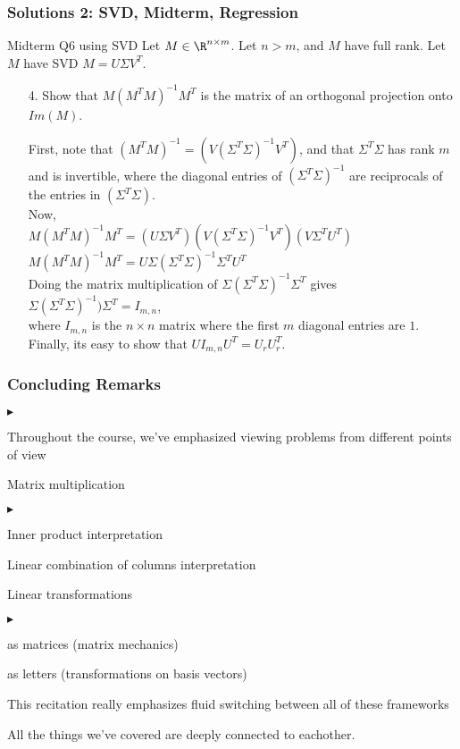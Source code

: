 \documentclass{beamer}
\renewenvironment{itemize}
\renewenvironment{enumerate}%
{\begin{list}{\arabic{enumi}.}%
      {\setlength{\leftmargin}{2.5em}%
       \setlength{\itemsep}{-\parsep}%
       \setlength{\topsep}{-\parskip}%
       \usecounter{enumi}}%
 }{\end{list}}
\renewenvironment{itemize}%
{\begin{list}{$\blacktriangleright$}%
      {\setlength{\leftmargin}{2.5em}%
       \setlength{\itemsep}{-\parsep}%
       \setlength{\topsep}{-\parskip}%
       \usecounter{enumi}}%
 }{\end{list}}
\begin{document}
\begin{frame}
\frametitle{Solutions 2: SVD, Midterm, Regression}
Midterm Q6 using SVD
Let $M\in \R^{n\times m}$. Let $n>m$, and $M$ have full rank. Let $M$ have SVD $M= U\Sigma V^T$.
\begin{enumerate}
\item[4.] Show that $M(M^TM)^{-1}M^T$ is the matrix of an orthogonal projection onto $Im(M)$.
\begin{solution}
First, note that $(M^TM)^{-1} = (V (\Sigma^T \Sigma)^{-1} V^T)$, and that $\Sigma^T \Sigma$ has rank $m$ and is invertible, where the diagonal entries of $(\Sigma^T \Sigma)^{-1}$ are reciprocals of the entries in $(\Sigma^T \Sigma)$. \\
Now,  \\
\quad $M(M^TM)^{-1}M^T = (U \Sigma V^T)(V (\Sigma^T \Sigma)^{-1} V^T)(V \Sigma^T U^T) $ \\ 
\quad $M(M^TM)^{-1}M^T = U \Sigma (\Sigma^T \Sigma)^{-1} \Sigma^T U^T $ \\ 
Doing the matrix multiplication of  $\Sigma (\Sigma^T \Sigma)^{-1} \Sigma^T $ gives \\

\quad $\Sigma (\Sigma^T \Sigma)^{-1}) \Sigma^T = I_{m,n}$,\\
where $I_{m,n}$ is the $n\times n$ matrix where the first $m$ diagonal entries are $1$. \\
Finally, its easy to show that $UI_{m,n}U^T = U_rU_r^T$.


\end{solution}
\end{enumerate}

\end{frame}

\begin{frame}
\frametitle{Concluding Remarks}
\begin{itemize}
\item Throughout the course, we've emphasized viewing problems from different points of view
\item Matrix multiplication
\begin{itemize}
\item Inner product interpretation
\item Linear combination of columns interpretation
\end{itemize}

\item Linear transformations
\begin{itemize}
\item as matrices (matrix mechanics)
\item as letters (transformations on basis vectors)
\end{itemize}
\item This recitation really emphasizes fluid switching between all of these frameworks
\item All the things we've covered are deeply connected to eachother.
\end{itemize}
\end{frame}
\end{document}
